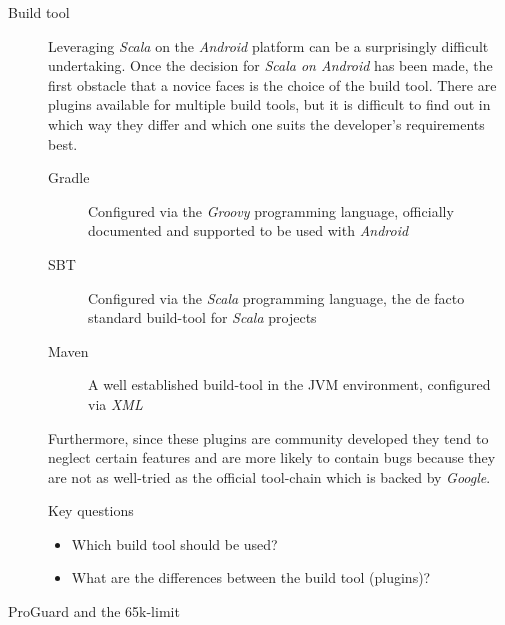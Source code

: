 \begin{description}

	\item[Build tool]\hfill

	Leveraging \textit{Scala} on the \textit{Android} platform can be a surprisingly difficult undertaking. Once the decision for \textit{Scala on Android} has been made, the  first obstacle that a novice faces is the choice of the build tool. There are plugins available for multiple build tools, but it is difficult to find out in which way they differ and which one suits the developer's requirements best.

	\begin{description}

		\item[Gradle]\hfill

		Configured via the \textit{Groovy} programming language, officially documented and supported to be used with \textit{Android}

		\item[\ac{SBT}]\hfill

		Configured via the \textit{Scala} programming language, the de facto standard build-tool for \textit{Scala} projects

		\item[Maven]\hfill

		A well established build-tool in the \ac{JVM} environment, configured via \textit{XML}

	\end{description}

	Furthermore, since these plugins are community developed they tend to neglect certain features and are more likely to contain bugs because they are not as well-tried as the official tool-chain which is backed by \textit{Google}.

	\begin{highlight}{Key questions}

		\begin{itemize}

			\item Which build tool should be used?

			\item What are the differences between the build tool (plugins)?

		\end{itemize}

	\end{highlight}

	\item[ProGuard and the 65k-limit]\hfill


\end{description}
